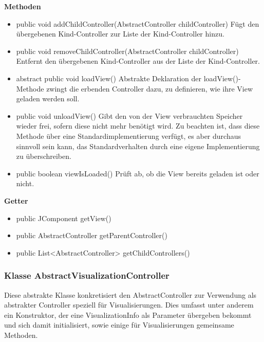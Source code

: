 \documentclass{article}
\begin{document}
      \textbf{Methoden}
      \begin{itemize}
        \item public void addChildController(AbstractController childController) \newline
          Fügt den übergebenen Kind-Controller zur Liste der Kind-Controller hinzu.
        
        \item public void removeChildController(AbstractController childController) \newline
          Entfernt den übergebenen Kind-Controller aus der Liste der Kind-Controller.
          
        \item abstract public void loadView() \newline
          Abstrakte Deklaration der loadView()-Methode zwingt die erbenden Controller dazu,
          zu definieren, wie ihre View geladen werden soll.
          
        \item public void unloadView() \newline
          Gibt den von der View verbrauchten Speicher wieder frei, sofern diese nicht mehr
          benötigt wird. Zu beachten ist, dass diese Methode über eine Standardimplementierung
          verfügt, es aber durchaus sinnvoll sein kann, das Standardverhalten durch eine
          eigene Implementierung zu überschreiben.
        
        \item public boolean viewIsLoaded() \newline
          Prüft ab, ob die View bereits geladen ist oder nicht.
      \end{itemize}
      
      \textbf{Getter}
      \begin{itemize}
        \item public JComponent getView()
        \item public AbstractController getParentController()
        \item public List<AbstractController> getChildControllers()
      \end{itemize}
	
	\subsubsection{Klasse AbstractVisualizationController}
	  Diese abstrakte Klasse konkretisiert den AbstractController zur Verwendung als
	  abstrakter Controller speziell für Visualisierungen. Dies umfasst unter anderem
	  ein Konstruktor, der eine VisualizationInfo als Parameter übergeben bekommt und
	  sich damit initialisiert, sowie einige für Visualisierungen gemeinsame Methoden.
	
\end{document}
